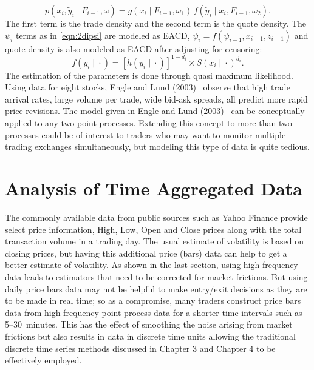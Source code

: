 	\begin{equation} \label{eqn:2pxiyi}
	p(x_i,\widetilde{y}_i \;|\; F_{i-1}, \omega) = g(x_i \;|\; F_{i-1}, \omega_1)\, f(\widetilde{y}_i \;|\; x_i, F_{i-1}, \omega_2).
	\end{equation}
The first term is the trade density and the second term is the quote density. The $\psi_i$ terms as in \eqref{eqn:2dipsi} are modeled as EACD, $\psi_i= f(\psi_{i-1}, x_{i-1}, z_{i-1})$ and quote density is also modeled as EACD after adjusting for censoring:
	\begin{equation} \label{eqn:2fdot}
	f(y_i \;|\; \cdot) = [h(y_i \;|\; \cdot)]^{1 - d_i} \times S(x_i \;|\; \cdot)^{d_i}.
	\end{equation}
The estimation of the parameters is done through quasi maximum likelihood. Using data for eight stocks, Engle and Lund (2003)~\cite{englelunde} observe that high trade arrival rates, large volume per trade, wide bid-ask spreads, all predict more rapid price revisions. The model given in Engle and Lund (2003)~\cite{englelunde} can be conceptually applied to any two point processes. Extending this concept to more than two processes could be of interest to traders who may want to monitor multiple trading exchanges simultaneously, but modeling this type of data is quite tedious. \label{in:point2}


\section{Analysis of Time Aggregated Data \label{s:analysis_tad}}

The commonly available data from public sources such as Yahoo Finance provide select price information, High, Low, Open and Close prices along with the total transaction volume in a trading day. The usual estimate of volatility is based on closing prices, but having this additional price (bars) data can help to get a better estimate of volatility. As shown in the last section, using high frequency data leads to estimators that need to be corrected for market frictions. But using daily price bars data may not be helpful to make entry/exit decisions as they are to be made in real time; so as a compromise, many traders construct price bars data from high frequency point process data for a shorter time intervals such as 5--30~minutes. This has the effect of smoothing the noise arising from market frictions but also results in data in discrete time units allowing the traditional discrete time series methods discussed in Chapter 3 and Chapter 4 to be effectively employed. 



